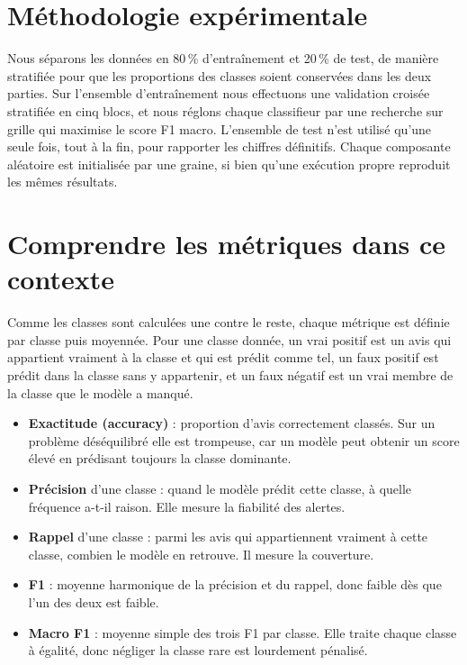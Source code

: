 \documentclass[11pt,a4paper]{article}
\begin{document}
\section{Méthodologie expérimentale}
Nous séparons les données en 80\,\% d'entraînement et 20\,\% de test, de manière
stratifiée pour que les proportions des classes soient conservées dans les deux parties.
Sur l'ensemble d'entraînement nous effectuons une validation croisée stratifiée en cinq
blocs, et nous réglons chaque classifieur par une recherche sur grille qui maximise le
score F1 macro. L'ensemble de test n'est utilisé qu'une seule fois, tout à la fin, pour
rapporter les chiffres définitifs. Chaque composante aléatoire est initialisée par une
graine, si bien qu'une exécution propre reproduit les mêmes résultats.

\section{Comprendre les métriques dans ce contexte}
Comme les classes sont calculées une contre le reste, chaque métrique est définie par
classe puis moyennée. Pour une classe donnée, un vrai positif est un avis qui appartient
vraiment à la classe et qui est prédit comme tel, un faux positif est prédit dans la
classe sans y appartenir, et un faux négatif est un vrai membre de la classe que le
modèle a manqué.

\begin{itemize}[leftmargin=1.4em]
\item \textbf{Exactitude (accuracy)} : proportion d'avis correctement classés. Sur un
problème déséquilibré elle est trompeuse, car un modèle peut obtenir un score élevé en
prédisant toujours la classe dominante.
\item \textbf{Précision} d'une classe : quand le modèle prédit cette classe, à quelle
fréquence a-t-il raison. Elle mesure la fiabilité des alertes.
\item \textbf{Rappel} d'une classe : parmi les avis qui appartiennent vraiment à cette
classe, combien le modèle en retrouve. Il mesure la couverture.
\item \textbf{F1} : moyenne harmonique de la précision et du rappel, donc faible dès que
l'un des deux est faible.
\item \textbf{Macro F1} : moyenne simple des trois F1 par classe. Elle traite chaque
classe à égalité, donc négliger la classe rare est lourdement pénalisé.
\end{itemize}
\end{document}
